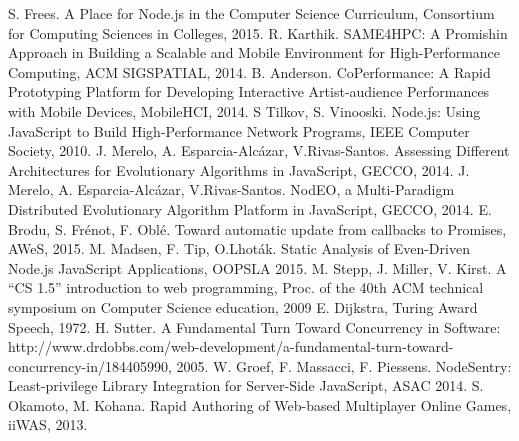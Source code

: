 \documentclass[12pt]{article} %
\begin{document}
\begin{thebibliography}{99} %

S. Frees. A Place for Node.js in the Computer Science Curriculum, Consortium for Computing Sciences in Colleges, 2015.
R. Karthik. SAME4HPC: A Promishin Approach in Building a Scalable and Mobile Environment for High-Performance Computing, ACM SIGSPATIAL, 2014.
B. Anderson. CoPerformance: A Rapid Prototyping Platform for Developing Interactive Artist-audience Performances with Mobile Devices, MobileHCI, 2014.
S Tilkov, S. Vinooski. Node.js: Using JavaScript to Build High-Performance Network Programs, IEEE Computer Society, 2010.
J. Merelo, A. Esparcia-Alcázar, V.Rivas-Santos. Assessing Different Architectures for Evolutionary Algorithms in JavaScript, GECCO, 2014.
J. Merelo, A. Esparcia-Alcázar, V.Rivas-Santos. NodEO, a Multi-Paradigm Distributed Evolutionary Algorithm Platform in JavaScript, GECCO, 2014.
E. Brodu, S. Frénot, F. Oblé. Toward automatic update from callbacks to Promises, AWeS, 2015.
M. Madsen, F. Tip, O.Lhoták. Static Analysis of Even-Driven Node.js JavaScript Applications, OOPSLA 2015.
M. Stepp, J. Miller, V. Kirst. A ``CS 1.5'' introduction to web programming, Proc. of the 40th ACM technical symposium on Computer Science education, 2009
E. Dijkstra, Turing Award Speech, 1972.
H. Sutter. A Fundamental Turn Toward Concurrency in Software: http://www.drdobbs.com/web-development/a-fundamental-turn-toward-concurrency-in/184405990, 2005.
W. Groef, F. Massacci, F. Piessens. NodeSentry: Least-privilege Library Integration for Server-Side JavaScript, ASAC 2014.
S. Okamoto, M. Kohana. Rapid Authoring of Web-based Multiplayer Online Games, iiWAS, 2013.

 
\end{thebibliography}

\end{document}
